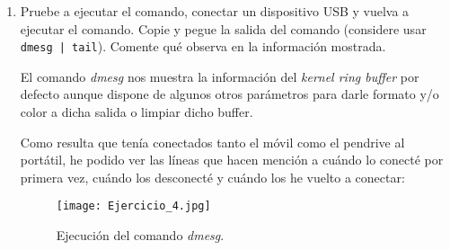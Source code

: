 \documentclass[paper=a4, fontsize=11pt]{scrartcl} %
\numberwithin{equation}{section} %
\numberwithin{figure}{section} %
\numberwithin{table}{section} %
\begin{document}
\begin{enumerate}
		En principio, el demonio \textit{cron}\cite{man_cron} ejecuta los comandos siguiendo las
		instrucciones dadas por el archivo \textit{crontab}\cite{man_crontab} y dispone además de una
		serie de repositorios con el fin de almacenar scripts con una periodicidad particular:
		\begin{itemize}
			\item \verb|/etc/cron.d| para ejecuciones de cualquier periodicidad.
			\item \verb|/etc/cron.hourly| para ejecuciones cada hora.
			\item \verb|/etc/cron.dialy| para ejecuciones cada día.
			\item \verb|/etc/cron.weekly| para ejecuciones cada semana.
			\item \verb|/etc/cron.monthly| para ejecuciones cada mes.
		\end{itemize}
		
		Para la tarea que nos piden realizar, creamos el siguiente script\footnote{He incluido el script
		directamente y se tienen ciertos errores en la visualización del $\%$.}:
		
		
		
		Y como queremos programar que la tarea se repita de forma diaria, la incluiremos en el directorio
		\verb|/etc/cron.dialy/| anteriormente mencionado.
		
	\subsection{Analizando qué ocurre en el \textit{kernel} con \textit{dmesg}}
		\item Pruebe a ejecutar el comando, conectar un dispositivo USB y vuelva a ejecutar el
		comando. Copie y pegue la salida del comando (considere usar \verb+dmesg | tail+). Comente
		qué observa en la información mostrada.
		
		El comando \textit{dmesg}\cite{man_dmesg} nos muestra la información del \textit{kernel ring
		buffer} por defecto aunque dispone de algunos otros parámetros para darle formato y/o color a
		dicha salida o limpiar dicho buffer.
		
		Como resulta que tenía conectados tanto el móvil como el pendrive al portátil, he podido ver las
		líneas que hacen mención a cuándo lo conecté por primera vez, cuándo los desconecté y cuándo los
		he vuelto a conectar:
		
		\begin{figure}[H]
			\centering
			\texttt{[image: Ejercicio\_4.jpg]}
			\caption{Ejecución del comando \textit{dmesg}.}
			\label{fig:dmesg}
		\end{figure}
		

\end{enumerate}
\end{document}
